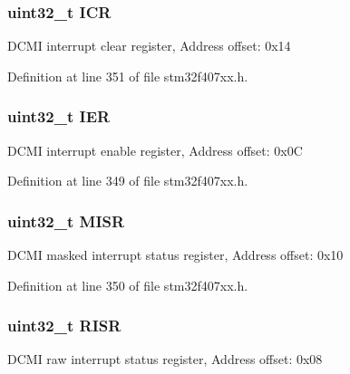 \subsubsection[{\texorpdfstring{I\+CR}{ICR}}]{ uint32\+\_\+t I\+CR}\hypertarget{struct_d_c_m_i___type_def_a0a8c8230846fd8ff154b9fde8dfa0399}{}\label{struct_d_c_m_i___type_def_a0a8c8230846fd8ff154b9fde8dfa0399}
D\+C\+MI interrupt clear register, Address offset\+: 0x14 

Definition at line 351 of file stm32f407xx.\+h.

\subsubsection[{\texorpdfstring{I\+ER}{IER}}]{ uint32\+\_\+t I\+ER}\hypertarget{struct_d_c_m_i___type_def_a6566f8cfbd1d8aa7e8db046aa35e77db}{}\label{struct_d_c_m_i___type_def_a6566f8cfbd1d8aa7e8db046aa35e77db}
D\+C\+MI interrupt enable register, Address offset\+: 0x0C 

Definition at line 349 of file stm32f407xx.\+h.

\subsubsection[{\texorpdfstring{M\+I\+SR}{MISR}}]{ uint32\+\_\+t M\+I\+SR}\hypertarget{struct_d_c_m_i___type_def_a524e134cec519206cb41d0545e382978}{}\label{struct_d_c_m_i___type_def_a524e134cec519206cb41d0545e382978}
D\+C\+MI masked interrupt status register, Address offset\+: 0x10 

Definition at line 350 of file stm32f407xx.\+h.

\subsubsection[{\texorpdfstring{R\+I\+SR}{RISR}}]{ uint32\+\_\+t R\+I\+SR}\hypertarget{struct_d_c_m_i___type_def_aa196fddf0ba7d6e3ce29bdb04eb38b94}{}\label{struct_d_c_m_i___type_def_aa196fddf0ba7d6e3ce29bdb04eb38b94}
D\+C\+MI raw interrupt status register, Address offset\+: 0x08 

